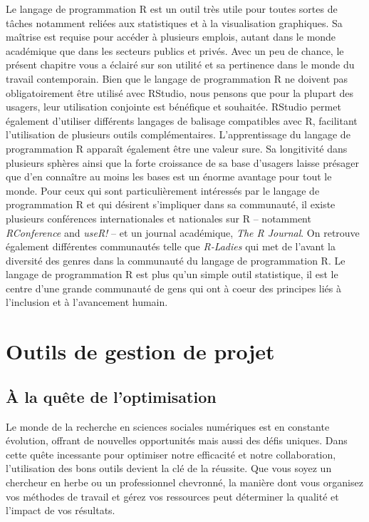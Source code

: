 \documentclass[
  letterpaper,
  DIV=11,
  numbers=noendperiod]{scrreprt}
\begin{document}
Le langage de programmation R est un outil très utile pour toutes sortes
de tâches notamment reliées aux statistiques et à la visualisation
graphiques. Sa maîtrise est requise pour accéder à plusieurs emplois,
autant dans le monde académique que dans les secteurs publics et privés.
Avec un peu de chance, le présent chapitre vous a éclairé sur son
utilité et sa pertinence dans le monde du travail contemporain. Bien que
le langage de programmation R ne doivent pas obligatoirement être
utilisé avec RStudio, nous pensons que pour la plupart des usagers, leur
utilisation conjointe est bénéfique et souhaitée. RStudio permet
également d'utiliser différents langages de balisage compatibles avec R,
facilitant l'utilisation de plusieurs outils complémentaires.
L'apprentissage du langage de programmation R apparaît également être
une valeur sure. Sa longitivité dans plusieurs sphères ainsi que la
forte croissance de sa base d'usagers laisse présager que d'en connaître
au moins les bases est un énorme avantage pour tout le monde. Pour ceux
qui sont particulièrement intéressés par le langage de programmation R
et qui désirent s'impliquer dans sa communauté, il existe plusieurs
conférences internationales et nationales sur R -- notamment
\emph{RConference} and \emph{useR!} -- et un journal académique,
\emph{The R Journal}. On retrouve également différentes communautés
telle que \emph{R-Ladies} qui met de l'avant la diversité des genres
dans la communauté du langage de programmation R. Le langage de
programmation R est plus qu'un simple outil statistique, il est le
centre d'une grande communauté de gens qui ont à coeur des principes
liés à l'inclusion et à l'avancement humain.


\chapter{Outils de gestion de projet}\label{outils-de-gestion-de-projet}

\section{À la quête de l'optimisation}\label{sec-chap3}

Le monde de la recherche en sciences sociales numériques est en
constante évolution, offrant de nouvelles opportunités mais aussi des
défis uniques. Dans cette quête incessante pour optimiser notre
efficacité et notre collaboration, l'utilisation des bons outils devient
la clé de la réussite. Que vous soyez un chercheur en herbe ou un
professionnel chevronné, la manière dont vous organisez vos méthodes de
travail et gérez vos ressources peut déterminer la qualité et l'impact
de vos résultats.
\end{document}
